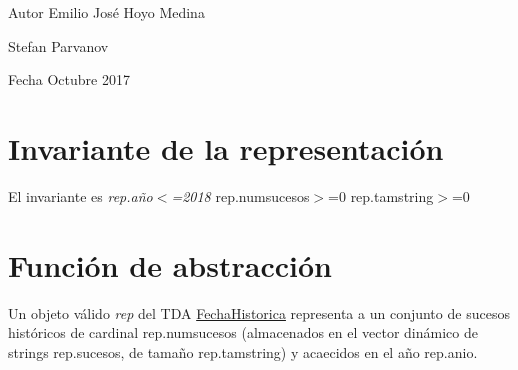 \begin{DoxyAuthor}{Autor}
Emilio José Hoyo Medina 

Stefan Parvanov 
\end{DoxyAuthor}
\begin{DoxyDate}{Fecha}
Octubre 2017
\end{DoxyDate}
\hypertarget{repConjunto_invConjunto}{}\section{Invariante de la representación}\label{repConjunto_invConjunto}
El invariante es {\itshape rep.\+año$<$=2018} rep.\+numsucesos$>$=0 rep.\+tamstring$>$=0\hypertarget{repConjunto_faConjunto}{}\section{Función de abstracción}\label{repConjunto_faConjunto}
Un objeto válido {\itshape rep} del T\+DA \hyperlink{classFechaHistorica}{Fecha\+Historica} representa a un conjunto de sucesos históricos de cardinal rep.\+numsucesos (almacenados en el vector dinámico de strings rep.\+sucesos, de tamaño rep.\+tamstring) y acaecidos en el año rep.\+anio. 